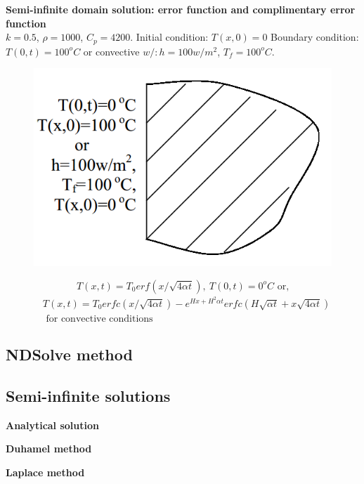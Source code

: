 \begin{example}
\textbf{Semi-infinite domain solution: error function and complimentary error
function}\\
$k = 0.5$, $\rho= 1000$, $C_p = 4200$.
Initial condition: $T(x,0)=0$
Boundary condition: $T(0,t)=100^oC$ or convective $w/:h=100w/m^2$, $T_f=100^oC$.
\begin{figure}[H]
  \centering
    \includegraphics[scale=0.5]{figures/appendixA/9}
\end{figure}
$$T(x,t)=T_0 erf(x/\sqrt{4\alpha t}),~T(0,t)=0^o C\text{ or,}$$
\begin{eqnarray*}
&T(x,t)=T_0 erfc(x/\sqrt{4\alpha t})-e^{Hx+H^2\alpha t}
erfc(H \sqrt{\alpha t}+x\sqrt{4\alpha t})\\
&\text{ for convective conditions}
\end{eqnarray*}
\end{example}

\subsection{NDSolve method}

\subsection{Semi-infinite solutions}
\begin{example}
\textbf{Analytical solution}
\end{example}

\begin{example}
\textbf{Duhamel method}
\end{example}

\begin{example}
\textbf{Laplace method}
\end{example}

